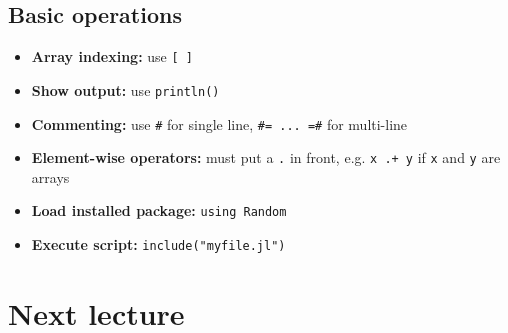 \documentclass[11pt]{article}
\begin{document}
\subsection{Basic operations}
\label{sec:orgfc6c4da}

\begin{itemize}
\item \textbf{Array indexing:} use \texttt{[ ]}
\item \textbf{Show output:} use \texttt{println()}
\item \textbf{Commenting:} use \texttt{\#} for single line, \texttt{\#= ... =\#} for multi-line
\item \textbf{Element-wise operators:} must put a \texttt{.} in front, e.g. \texttt{x .+ y} if \texttt{x} and \texttt{y} are arrays
\item \textbf{Load installed package:} \texttt{using Random}
\item \textbf{Execute script:} \texttt{include("myfile.jl")}
\end{itemize}

\section{Next lecture}
\label{sec:org70b29e4}
\end{document}
